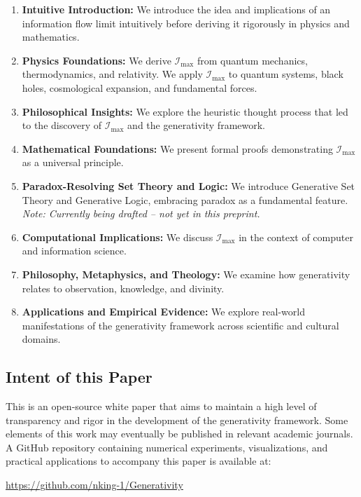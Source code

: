 \documentclass[12pt]{article}
\begin{document}
\begin{enumerate}
    \item \textbf{Intuitive Introduction:} We introduce the idea and implications of an information flow limit intuitively before deriving it rigorously in physics and mathematics.
    \item \textbf{Physics Foundations:} We derive $\mathcal{I}_{\text{max}}$ from quantum mechanics, thermodynamics, and relativity. We apply $\mathcal{I}_{\text{max}}$ to quantum systems, black holes, cosmological expansion, and fundamental forces.
    \item \textbf{Philosophical Insights:} We explore the heuristic thought process that led to the discovery of $\mathcal{I}_{\text{max}}$ and the generativity framework.
    \item \textbf{Mathematical Foundations:} We present formal proofs demonstrating $\mathcal{I}_{\text{max}}$ as a universal principle.
    \item \textbf{Paradox-Resolving Set Theory and Logic:} We introduce Generative Set Theory and Generative Logic, embracing paradox as a fundamental feature. \textit{Note: Currently being drafted -- not yet in this preprint.}
    \item \textbf{Computational Implications:} We discuss $\mathcal{I}_{\text{max}}$ in the context of computer and information science.
    \item \textbf{Philosophy, Metaphysics, and Theology:} We examine how generativity relates to observation, knowledge, and divinity.
    \item \textbf{Applications and Empirical Evidence:} We explore real-world manifestations of the generativity framework across scientific and cultural domains.
\end{enumerate}

\subsection{Intent of this Paper}

This is an open-source white paper that aims to maintain a high level of transparency and rigor in the development of the generativity framework. Some elements of this work may eventually be published in relevant academic journals. A GitHub repository containing numerical experiments, visualizations, and practical applications to accompany this paper is available at:
\begin{center}
    \url{https://github.com/nking-1/Generativity}
\end{center}
\end{document}
